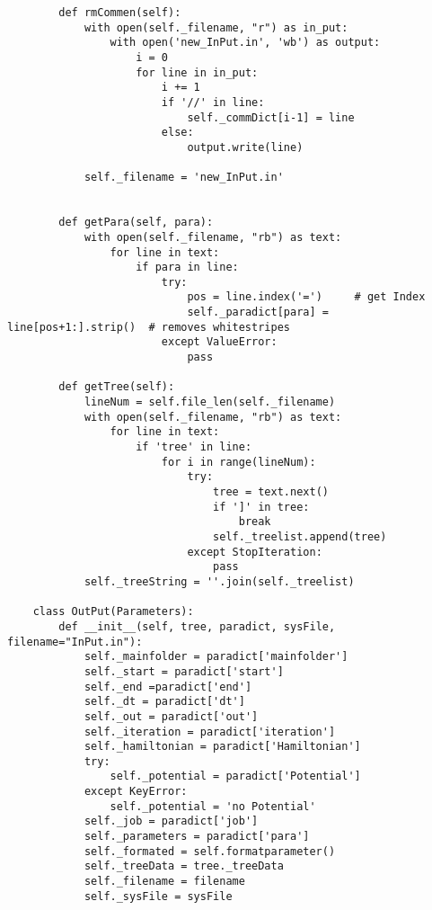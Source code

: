 \begin{verbatim}
        def rmCommen(self):
            with open(self._filename, "r") as in_put:
                with open('new_InPut.in', 'wb') as output:
                    i = 0
                    for line in in_put:
                        i += 1
                        if '//' in line:
                            self._commDict[i-1] = line
                        else:
                            output.write(line)
    
            self._filename = 'new_InPut.in'              
    
    
        def getPara(self, para):
            with open(self._filename, "rb") as text:
                for line in text:
                    if para in line:
                        try:
                            pos = line.index('=')     # get Index
                            self._paradict[para] = line[pos+1:].strip()  # removes whitestripes
                        except ValueError:
                            pass
    
        def getTree(self):                
            lineNum = self.file_len(self._filename)
            with open(self._filename, "rb") as text:
                for line in text:
                    if 'tree' in line:
                        for i in range(lineNum):
                            try:
                                tree = text.next()
                                if ']' in tree:
                                    break
                                self._treelist.append(tree)
                            except StopIteration:
                                pass
            self._treeString = ''.join(self._treelist)
    
    class OutPut(Parameters):
        def __init__(self, tree, paradict, sysFile, filename="InPut.in"):
            self._mainfolder = paradict['mainfolder']
            self._start = paradict['start']
            self._end =paradict['end']
            self._dt = paradict['dt']
            self._out = paradict['out']
            self._iteration = paradict['iteration']
            self._hamiltonian = paradict['Hamiltonian']
            try:
                self._potential = paradict['Potential']
            except KeyError:
                self._potential = 'no Potential'
            self._job = paradict['job']
            self._parameters = paradict['para']
            self._formated = self.formatparameter()
            self._treeData = tree._treeData
            self._filename = filename
            self._sysFile = sysFile
    

\end{verbatim}
